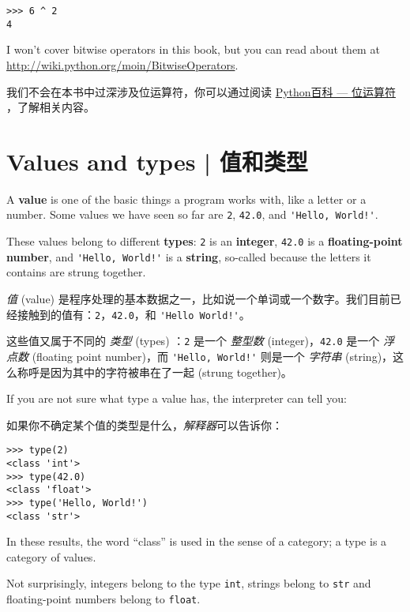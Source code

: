 \begin{lstlisting}
>>> 6 ^ 2
4
\end{lstlisting}
%
I won't cover
bitwise operators in this book, but you can read about
them at \url{http://wiki.python.org/moin/BitwiseOperators}.

我们不会在本书中过深涉及位运算符，你可以通过阅读 \href{http://wiki.python.org/moin/BitwiseOperators}{Python百科 --- 位运算符} ，了解相关内容。
  
  

\section{Values and types  |  值和类型}
    


A {\bf value} is one of the basic things a program works with, like a
letter or a number.  Some values we have seen so far are {\tt 2},
{\tt 42.0}, and \verb"'Hello, World!'".

These values belong to different {\bf types}:
{\tt 2} is an {\bf integer}, {\tt 42.0} is a {\bf floating-point number},
and \verb"'Hello, World!'" is a {\bf string},
so-called because the letters it contains are strung together.

\emph{值} (value) 是程序处理的基本数据之一，比如说一个单词或一个数字。我们目前已经接触到的值有：\lstinline{2}，\lstinline{42.0}，和 \lstinline{'Hello World!'}。

这些值又属于不同的 \emph{类型} (types) ：\lstinline{2} 是一个 \emph{整型数} (integer)，\lstinline{42.0} 是一个 \emph{浮点数} (floating point number)，而 \lstinline{'Hello, World!'}  则是一个  \emph{字符串} (string)，这么称呼是因为其中的字符被串在了一起 (strung together)。

If you are not sure what type a value has, the interpreter can
tell you:

如果你不确定某个值的类型是什么，\emph{解释器}可以告诉你：

\begin{lstlisting}
>>> type(2)
<class 'int'>
>>> type(42.0)
<class 'float'>
>>> type('Hello, World!')
<class 'str'>
\end{lstlisting}
%
In these results, the word ``class'' is used in the sense of
a category; a type is a category of values.

Not surprisingly, integers belong to the type {\tt int},
strings belong to {\tt str} and floating-point
numbers belong to {\tt float}.
    
    

